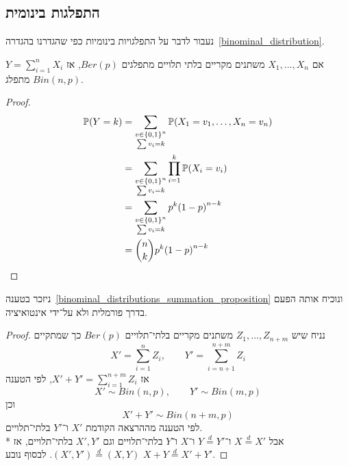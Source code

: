 \subsection{התפלגות בינומית}
נעבור לדבר על התפלגויות בינומיות כפי שהגדרנו בהגדרה\ \ref{binominal_distribution}.
\begin{proposition}
	אם $X_1, \dots, X_n$ משתנים מקריים בלתי תלויים מתפלגים $Ber(p)$, אז $Y = \sum_{i = 1}^n X_i$ מתפלג $Bin(n, p)$.
\end{proposition}
\begin{proof}
	\begin{align*}
		\mathbb{P}(Y = k)
		& = \sum_{\substack{v \in {\{0, 1\}}^n \\ \sum v_i = k}} \mathbb{P}(X_1 = v_1, \dots, X_n = v_n) \\
		& = \sum_{\substack{v \in {\{0, 1\}}^n \\ \sum v_i = k}} \prod_{i = 1}^k \mathbb{P}(X_i = v_i) \\
		& = \sum_{\substack{v \in {\{0, 1\}}^n \\ \sum v_i = k}} p^k {(1 - p)}^{n - k} \\
		& = \binom{n}{k} p^k {(1 - p)}^{n - k}
	\end{align*}
\end{proof}
ניזכר בטענה\ \ref{binominal_distributions_summation_proposition} ונוכיח אותה הפעם בדרך פורמלית ולא על־ידי אינטואיציה.
\begin{proof}
	נניח שיש $Z_1, \dots, Z_{n + m}$ משתנים מקריים בלתי־תלויים $Ber(p)$ כך שמתקיים
	\[
		X' = \sum_{i = 1}^n Z_i,
		\qquad
		Y' = \sum_{i = n + 1}^{n + m} Z_i
	\]
	אז $X' + Y' = \sum_{i = 1}^{n + m} Z_i$, לפי הטענה
	\[
		X' \sim Bin(n, p),
		\qquad
		Y' \sim Bin(m, p)
	\]
	וכן
	\[
		X' + Y' \sim Bin(n + m, p)
	\]
	לפי הטענה מההרצאה הקודמת $X'$ ו־$Y'$ בלתי־תלויים. \\*
	אבל $X \overset{d}{=} X'$ ו־$Y \overset{d}{=} Y'$ ו־$X$ ו־$Y$ בלתי־תלויים וגם $X', Y'$ בלתי־תלויים, אז $(X', Y') \overset{d}{=} (X, Y)$.
	לבסוף נובע $X + Y \overset{d}{=} X' + Y'$.
\end{proof}

